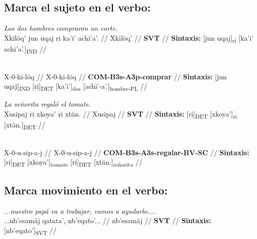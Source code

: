 \documentclass{article}%
\begin{document}
\subsection{Marca el sujeto en el verbo:}%
\label{subsec:Marcaelsujetoenelverbo}%

%
\par\medskip%
\ex
\textit{Los dos hombres compraron un corte.} \\
\begingl
\gla Xkilöq' jun uqaj ri ka'i' achi'a'. //
\glb Xkilöq' //
\glc \textbf{SVT} //
\glft \textbf{Sintaxis:} [jun uqaj]\textsubscript{ri} [ka'i' achi'a'.]\textsubscript{IND} //
\endgl
\xe
%
\medskip%
\par\medskip%
\ex
\textit{} \\
\begingl
\gla X-0-ki-löq //
\glb X-0-ki-löq //
\glc \textbf{COM-}\textbf{B3s-}\textbf{A3p-}\textbf{comprar} //
\glft \textbf{Sintaxis:} [jun uqaj]\textsubscript{IND} [ri]\textsubscript{DET} [ka'i']\textsubscript{dos} [achi'-a'.]\textsubscript{hombre-PL} //
\endgl
\xe
%
\medskip%
\par\medskip%
\ex
\textit{La señorita regaló el tomate.} \\
\begingl
\gla Xusipaj ri xkoya' ri xtän. //
\glb Xusipaj //
\glc \textbf{SVT} //
\glft \textbf{Sintaxis:} [ri]\textsubscript{DET} [xkoya']\textsubscript{ri} [xtän.]\textsubscript{DET} //
\endgl
\xe
%
\medskip%
\par\medskip%
\ex
\textit{} \\
\begingl
\gla X-0-u-sip-a-j //
\glb X-0-u-sip-a-j //
\glc \textbf{COM-}\textbf{B3s-}\textbf{A3s-}\textbf{regalar-}\textbf{BV-}\textbf{SC} //
\glft \textbf{Sintaxis:} [ri]\textsubscript{DET} [xkoya']\textsubscript{tomate} [ri]\textsubscript{DET} [xtän.]\textsubscript{señorita} //
\endgl
\xe
%
\medskip%
\subsection{Marca movimiento en el verbo:}%
\label{subsec:Marcamovimientoenelverbo}%

%
\par\medskip%
\ex
\textit{...nuestro papá va a trabajar, vamos a ayudarlo....} \\
\begingl
\gla ...nb'esamäj qatata', nb'eqato'... //
\glb nb'esamäj //
\glc \textbf{SVT} //
\glft \textbf{Sintaxis:} [nb'eqato']\textsubscript{SVT} //
\endgl
\xe
%
\medskip

%
\end{document}

